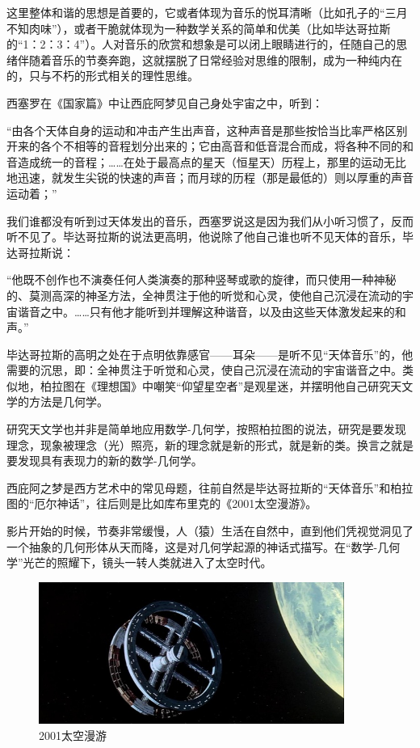 这里整体和谐的思想是首要的，它或者体现为音乐的悦耳清晰（比如孔子的“三月不知肉味”），或者干脆就体现为一种数学关系的简单和优美（比如毕达哥拉斯的“1：2：3：4”）。人对音乐的欣赏和想象是可以闭上眼睛进行的，任随自己的思绪伴随着音乐的节奏奔跑，这就摆脱了日常经验对思维的限制，成为一种纯内在的，只与不朽的形式相关的理性思维。

西塞罗在《国家篇》中让西庇阿梦见自己身处宇宙之中，听到：

“由各个天体自身的运动和冲击产生出声音，这种声音是那些按恰当比率严格区别开来的各个不相等的音程划分出来的；它由高音和低音混合而成，将各种不同的和音造成统一的音程；……在处于最高点的星天（恒星天）历程上，那里的运动无比地迅速，就发生尖锐的快速的声音；而月球的历程（那是最低的）则以厚重的声音运动着；”

我们谁都没有听到过天体发出的音乐，西塞罗说这是因为我们从小听习惯了，反而听不见了。毕达哥拉斯的说法更高明，他说除了他自己谁也听不见天体的音乐，毕达哥拉斯说：

“他既不创作也不演奏任何人类演奏的那种竖琴或歌的旋律，而只使用一种神秘的、莫测高深的神圣方法，全神贯注于他的听觉和心灵，使他自己沉浸在流动的宇宙谐音之中。……只有他才能听到并理解这种谐音，以及由这些天体激发起来的和声。”

毕达哥拉斯的高明之处在于点明依靠感官——耳朵——是听不见“天体音乐”的，他需要的沉思，即：全神贯注于听觉和心灵，使自己沉浸在流动的宇宙谐音之中。类似地，柏拉图在《理想国》中嘲笑“仰望星空者”是观星迷，并摆明他自己研究天文学的方法是几何学。

研究天文学也并非是简单地应用数学-几何学，按照柏拉图的说法，研究是要发现理念，现象被理念（光）照亮，新的理念就是新的形式，就是新的类。换言之就是要发现具有表现力的新的数学-几何学。

西庇阿之梦是西方艺术中的常见母题，往前自然是毕达哥拉斯的“天体音乐”和柏拉图的“厄尔神话”，往后则是比如库布里克的《2001太空漫游》。

影片开始的时候，节奏非常缓慢，人（猿）生活在自然中，直到他们凭视觉洞见了一个抽象的几何形体从天而降，这是对几何学起源的神话式描写。在“数学-几何学”光芒的照耀下，镜头一转人类就进入了太空时代。

\begin{figure}[htbp]
\begin{center}
\includegraphics[width=10cm]{Preface/2001space.jpg}
\caption{2001太空漫游}
\end{center}
\end{figure}

